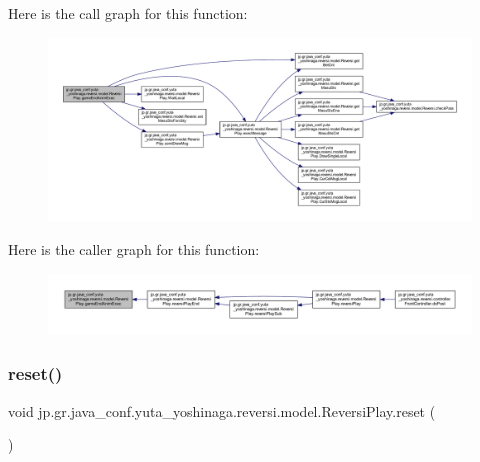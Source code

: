 Here is the call graph for this function\+:
\nopagebreak
\begin{figure}[H]
\begin{center}
\leavevmode
\includegraphics[width=350pt]{classjp_1_1gr_1_1java__conf_1_1yuta__yoshinaga_1_1reversi_1_1model_1_1_reversi_play_aaf0f07bdc219b6d8ec5551457fb551ab_cgraph}
\end{center}
\end{figure}
Here is the caller graph for this function\+:
\nopagebreak
\begin{figure}[H]
\begin{center}
\leavevmode
\includegraphics[width=350pt]{classjp_1_1gr_1_1java__conf_1_1yuta__yoshinaga_1_1reversi_1_1model_1_1_reversi_play_aaf0f07bdc219b6d8ec5551457fb551ab_icgraph}
\end{center}
\end{figure}
\mbox{\label{classjp_1_1gr_1_1java__conf_1_1yuta__yoshinaga_1_1reversi_1_1model_1_1_reversi_play_a040fddf6e59c00de4c9c2ecdaedcb574}} 
\subsubsection{\texorpdfstring{reset()}{reset()}}
{\footnotesize\ttfamily void jp.\+gr.\+java\+\_\+conf.\+yuta\+\_\+yoshinaga.\+reversi.\+model.\+Reversi\+Play.\+reset (\begin{DoxyParamCaption}{ }\end{DoxyParamCaption})}



